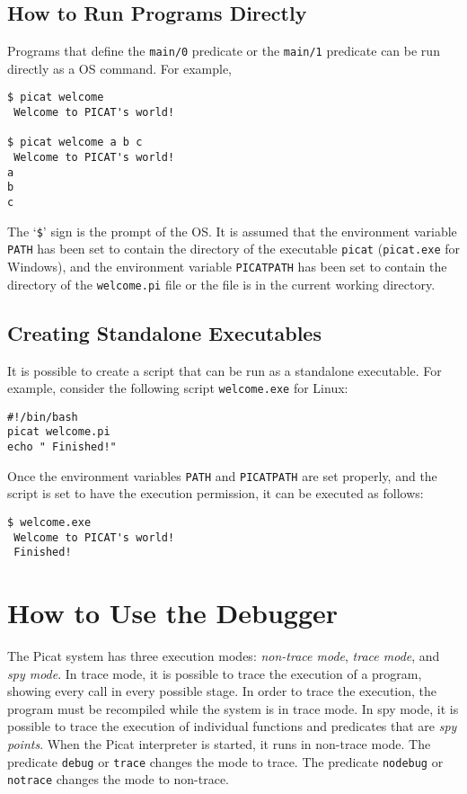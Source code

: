 \subsection{How to Run Programs Directly}
Programs that define the \texttt{main/0} predicate or the \texttt{main/1} predicate can be run directly as a OS command. For example,
\begin{verbatim}
$ picat welcome
 Welcome to PICAT's world!

$ picat welcome a b c
 Welcome to PICAT's world!
a
b
c
\end{verbatim}
The\/ `{\texttt \$}' sign is the prompt of the OS. It is assumed that the environment variable \texttt{PATH} has been set to contain the directory of the executable \texttt{picat} (\texttt{picat.exe} for Windows), and the environment variable \texttt{PICATPATH} has been set to contain the directory of the \texttt{welcome.pi} file or the file is in the current working directory.

\subsection{Creating Standalone Executables}
It is possible to create a script that can be run as a standalone executable. For example, consider the following script \texttt{welcome.exe} for Linux:

\begin{verbatim}
#!/bin/bash          
picat welcome.pi
echo " Finished!"
\end{verbatim}
Once the environment variables \texttt{PATH} and \texttt{PICATPATH} are set properly, and the script is set to have the execution permission, it can be executed as follows:

\begin{verbatim}
$ welcome.exe 
 Welcome to PICAT's world! 
 Finished!
\end{verbatim}

\section{How to Use the Debugger}
The Picat system has three execution modes: \textit{non-trace mode}, \textit{trace mode}, and \textit{spy mode}.  In trace mode, it is possible to trace the execution of a program, showing every call in every possible stage.  In order to trace the execution, the program must be recompiled while the system is in trace mode.  In spy mode, it is possible to trace the execution of individual functions and predicates that are {\it spy points}. When the Picat interpreter is started, it runs in non-trace mode. The predicate \texttt{debug} or \texttt{trace}  changes the mode to trace. The predicate \texttt{nodebug} or \texttt{notrace} changes the mode to non-trace.

